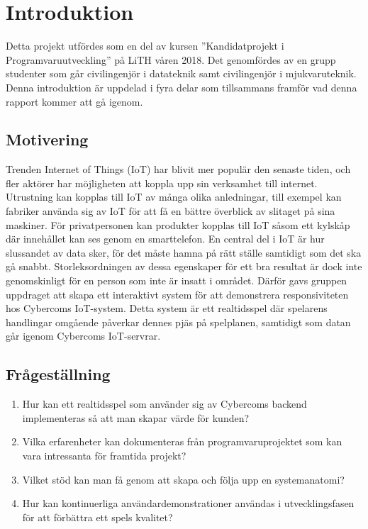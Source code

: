 \chapter{Introduktion}
\label{cha:introduction}

Detta projekt utfördes som en del av kursen ''Kandidatprojekt i Programvaruutveckling'' på LiTH våren 2018. Det genomfördes av en grupp studenter som går civilingenjör i datateknik samt civilingenjör i mjukvaruteknik.
Denna introduktion är uppdelad i fyra delar som tillsammans framför vad denna rapport kommer att gå igenom.

\section{Motivering}
\label{sec:motivation}
Trenden Internet of Things (IoT) har blivit mer populär den senaste tiden\cite{IoT-ecosystem}, och fler aktörer har möjligheten att koppla upp sin verksamhet till internet. Utrustning kan kopplas till IoT av många olika anledningar, till exempel kan fabriker använda sig av IoT för att få en bättre överblick av slitaget på sina maskiner. För privatpersonen kan produkter kopplas till IoT såsom ett kylskåp där innehållet kan ses genom en smarttelefon. En central del i IoT är hur slussandet av data sker, för det måste hamna på rätt ställe samtidigt som det ska gå snabbt. Storleksordningen av dessa egenskaper för ett bra resultat är dock inte genomskinligt för en person som inte är insatt i området. Därför gavs gruppen uppdraget att skapa ett interaktivt system för att demonstrera responsiviteten hos Cybercoms IoT-system. Detta system är ett realtidsspel där spelarens handlingar omgående påverkar dennes pjäs på spelplanen, samtidigt som datan går igenom Cybercoms IoT-servrar.


\section{Frågeställning}

\begin{enumerate}
	\item \label{fs:fs_1} Hur kan ett realtidsspel som använder sig av Cybercoms backend implementeras så att man skapar värde för kunden?
	\item \label{fs:fs_2} Vilka erfarenheter kan dokumenteras från programvaruprojektet som kan vara intressanta för framtida projekt?
	\item \label{fs:fs_3} Vilket stöd kan man få genom att skapa och följa upp en systemanatomi?
	\item \label{fs:fs_4} Hur kan kontinuerliga användardemonstrationer användas i utvecklingsfasen för att förbättra ett spels kvalitet?

\end{enumerate}

